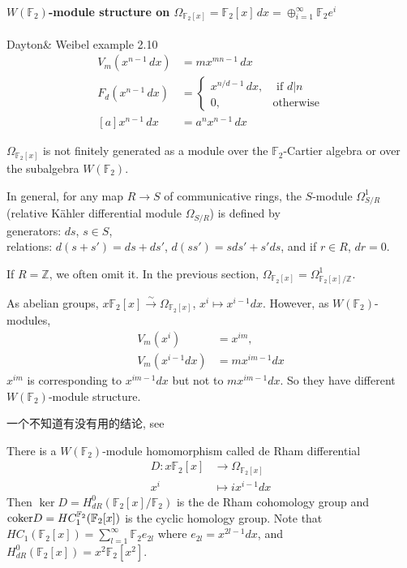 \paragraph{$W(\mathbb{F}_2)$-module structure on $\Omega_{\mathbb{F}_2[x]}=\mathbb{F}_2[x]\,dx = \oplus_{i=1}^\infty \mathbb{F}_2 e^i$} Dayton\& Weibel \cite{MR96j:16008}example 2.10
\begin{align*}
 V_m(x^{n-1}\,dx)&=mx^{mn-1}\,dx\\
 F_d(x^{n-1}\,dx)&=\begin{cases}
 	x^{n/d-1}\,dx,& \mbox{ if $d|n$}\\
 	0,& \mbox{otherwise}
 \end{cases}\\
 [a]x^{n-1}\,dx&=a^nx^{n-1}\,dx
 \end{align*}
 \begin{remark}
 	$\Omega_{\mathbb{F}_2[x]}$ is {\color{red}not} finitely generated as a module over the $\mathbb{F}_2$-Cartier algebra or over the subalgebra $W(\mathbb{F}_2)$.
 \end{remark}

 In general, for any map $R\longrightarrow S$ of communicative rings, the $S$-module $\Omega_{S/R}^1$(relative K{\"{a}}hler differential module $\Omega_{S/R}$) is defined by \\
 generators: $ds$, $s\in S$,\\
 relations: $d(s+s')=ds+ds'$, $d(ss')=sds'+s'ds$, and if $r\in R$, $dr=0$.\\

\begin{remark}
	If $R=\mathbb{Z}$, we often omit it. In the previous section, $\Omega_{\mathbb{F}_2[x]}=\Omega_{\mathbb{F}_2[x]/\mathbb{Z}}^1$.
\end{remark}

As abelian groups, $x \mathbb{F}_2[x] \overset{\sim}\longrightarrow \Omega_{\mathbb{F}_2[x]}$, $x^i \mapsto x^{i-1}dx$. However, as $W(\mathbb{F}_2)$-modules,
\begin{align*}
V_m(x^i)&=x^{im},\\
V_m(x^{i-1}dx)&=mx^{im-1}dx
\end{align*}
$x^{im}$ is corresponding to $x^{im-1}dx$ but not to $mx^{im-1}dx$. So they have different $W(\mathbb{F}_2)$-module structure.

\begin{remark}
	一个不知道有没有用的结论, see \cite{MR96j:16008} 

	There is a $W(\mathbb{F}_2)$-module homomorphism called de Rham differential
	\begin{align*}
	D\colon x \mathbb{F}_2[x] &\longrightarrow \Omega_{\mathbb{F}_2[x]}\\
	x^i &\mapsto ix^{i-1}dx
	\end{align*}
	Then $\ker D = H_{dR}^0(\mathbb{F}_2[x]/\mathbb{F}_2)$ is the de Rham cohomology group and $\mathrm{coker} D = HC_1^{\mathbb{F}_2}(\mathbb{F}_2[x])$ is the cyclic homology group. Note that $HC_1(\mathbb{F}_2[x])= \sum_{l=1}^{\infty}\mathbb{F}_2 e_{2l}$ where $e_{2l}=x^{2l-1}dx$, and $H_{dR}^0(\mathbb{F}_2[x])=x^2 \mathbb{F}_2[x^2]$.
\end{remark}
